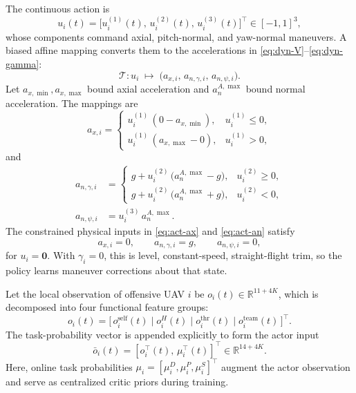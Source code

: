 \documentclass{cja}
\begin{document}
The continuous action is
\begin{equation}
u_i(t)=\bigl[u_i^{(1)}(t),\,u_i^{(2)}(t),\,u_i^{(3)}(t)\bigr]^{\top}\in[-1,1]^3,
\label{eq:rl-action}
\end{equation}
whose components command axial, pitch-normal, and yaw-normal maneuvers. A biased affine mapping converts them to the accelerations in \eqref{eq:dyn-V}--\eqref{eq:dyn-gamma}:
\begin{equation}
\mathcal{T}:u_i\;\longmapsto\;\bigl(a_{x,i},\,a_{n,\gamma,i},\,a_{n,\psi,i}\bigr).
\end{equation}
Let $a_{x,\min},a_{x,\max}$ bound axial acceleration and $a_n^{A,\max}$ bound normal acceleration. The mappings are
\begin{equation}
a_{x,i}=
\begin{cases}
u_i^{(1)}\,(0-a_{x,\min}), & u_i^{(1)}\le 0,\\[2pt]
u_i^{(1)}\,(a_{x,\max}-0), & u_i^{(1)}>0,
\end{cases}
\label{eq:act-ax}
\end{equation}
and
\begin{equation}
\begin{aligned}
a_{n,\gamma,i}
&=
\begin{cases}
g+u_i^{(2)}\,\bigl(a_n^{A,\max}-g\bigr), & u_i^{(2)}\ge 0,\\[2pt]
g+u_i^{(2)}\,\bigl(a_n^{A,\max}+g\bigr), & u_i^{(2)}<0,
\end{cases}
\\
a_{n,\psi,i}
&=u_i^{(3)}\,a_n^{A,\max}.
\end{aligned}
\label{eq:act-an}
\end{equation}
The constrained physical inputs in \eqref{eq:act-ax} and \eqref{eq:act-an} satisfy
\begin{equation}
a_{x,i}=0,\qquad a_{n,\gamma,i}=g,\qquad a_{n,\psi,i}=0,
\end{equation}
for $u_i=\mathbf{0}$. With $\gamma_i=0$, this is level, constant-speed, straight-flight trim, so the policy learns maneuver corrections about that state.

Let the local observation of offensive UAV $i$ be $o_i(t)\in\mathbb{R}^{11+4K}$, which is decomposed into four functional feature groups:
\begin{equation}
o_i(t)=\bigl[\,o_i^{\mathrm{self}}(t)\;\big|\;o_i^{H}(t)\;\big|\;o_i^{\mathrm{thr}}(t)\;\big|\;o_i^{\mathrm{team}}(t)\,\bigr]^{\top}.
\label{eq:obs-decomp}
\end{equation}
The task-probability vector is appended explicitly to form the actor input
\begin{equation}
\bar o_i(t)
=
\left[o_i^{\top}(t),\,\mu_i^{\top}(t)\right]^{\top}
\in\mathbb R^{14+4K}.
\end{equation}
Here, online task probabilities $\mu_i=[\mu_i^D,\mu_i^P,\mu_i^S]^{\top}$ augment the actor observation and serve as centralized critic priors during training.
\end{document}
